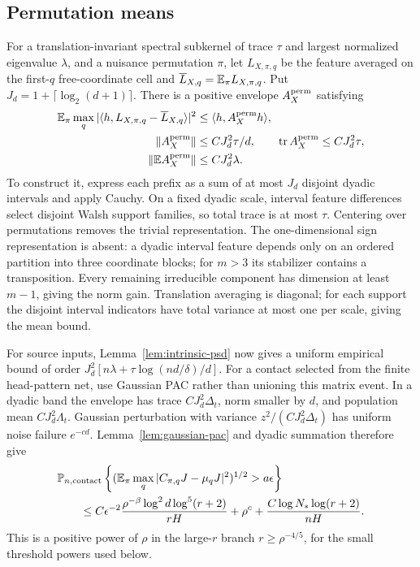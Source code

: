 \subsection{Permutation means}
For a translation-invariant spectral subkernel of trace $\tau$ and
largest normalized eigenvalue $\lambda$, and a nuisance permutation
$\pi$, let $L_{X,\pi,q}$ be the feature
averaged on the first-$q$ free-coordinate cell and
$\overline L_{X,q}=\mathbb E_\pi L_{X,\pi,q}$. Put $J_d=1+\lceil\log_2(d+1)\rceil$.
There is a positive envelope $A_X^{\rm perm}$ satisfying
\begin{align*}
 \mathbb E_\pi\max_q|\langle h,L_{X,\pi,q}-\overline L_{X,q}\rangle|^2
       &\le\langle h,A_X^{\rm perm}h\rangle,\\
 \|A_X^{\rm perm}\|&\le CJ_d^2\tau/d,\qquad
 \operatorname{tr}A_X^{\rm perm}\le CJ_d^2\tau,\\
 \|\mathbb E A_X^{\rm perm}\|&\le CJ_d^2\lambda.
\end{align*}
To construct it, express each prefix as a sum of at most $J_d$ disjoint
dyadic intervals and apply Cauchy. On a fixed dyadic scale, interval
feature differences select disjoint Walsh support families, so total
trace is at most $\tau$. Centering over permutations removes the
trivial representation. The one-dimensional sign representation is
absent: a dyadic interval feature depends only on an ordered partition
into three coordinate blocks; for $m>3$ its stabilizer contains a
transposition. Every remaining irreducible component has dimension
at least $m-1$, giving the norm gain.
Translation averaging is diagonal; for each support the disjoint
interval indicators have total variance at most one per scale, giving
the mean bound.

For source inputs, Lemma~\ref{lem:intrinsic-psd} now gives a uniform
empirical bound of order
$J_d^2[n\lambda+\tau\log(nd/\delta)/d]$.
For a contact selected from the finite head-pattern net, use Gaussian
PAC rather than unioning this matrix event. In a dyadic band the envelope
has trace $CJ_d^2\Delta_t$, norm smaller by $d$, and population mean
$CJ_d^2\Lambda_t$. Gaussian perturbation with variance
$z^2/(CJ_d^2\Delta_t)$ has uniform noise failure $e^{-cd}$.
Lemma~\ref{lem:gaussian-pac} and dyadic summation therefore give
\begin{align*}
 &\mathbb P_{n,\rm contact}\left\{
 (\mathbb E_\pi\max_q|C_{\pi,q}J-\mu_qJ|^2)^{1/2}>a\epsilon\right\}\\
 &\qquad\le C\epsilon^{-2}\frac{\rho^{-\beta}\log^2d\log^5(r+2)}{rH}
 +\rho^c+\frac{C\log N_*\log(r+2)}{nH}.
\end{align*}
This is a positive power of $\rho$ in the large-$r$ branch
$r\ge\rho^{-4/5}$, for the small threshold powers used below.

